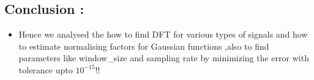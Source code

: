 \documentclass[8pt]{article}
\providecommand{\tightlist}{%
      \setlength{\itemsep}{0pt}\setlength{\parskip}{0pt}}
\begin{document}
    \subsection{Conclusion :}\label{conclusion}

\begin{itemize}
\tightlist
\item
  Hence we analysed the how to find DFT for various types of signals and
  how to estimate normalising factors for Gaussian functions ,also to
  find parameters like window\_size and sampling rate by minimizing the
  error with tolerance upto \(10^{-15}!!\)
\end{itemize}


    
    
    
    
\end{document}
